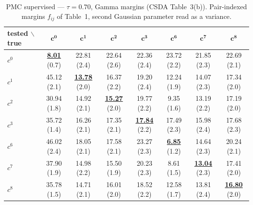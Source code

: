 \begin{table}[htbp]
  \centering
  \small
  \setlength{\tabcolsep}{4pt}
  \caption{PMC supervised — $\tau = 0.70$, Gamma margins (CSDA Table~3(b)). Pair-indexed margins $f_{ij}$ of Table~1, second Gaussian parameter read as a variance.}
  \label{tab:exp1-high_tau_gamma}
  \begin{tabular}{lccccccc}
    \toprule
    tested $\backslash$ true & $\mathbf{c^{0}}$ & $\mathbf{c^{1}}$ & $\mathbf{c^{2}}$ & $\mathbf{c^{3}}$ & $\mathbf{c^{6}}$ & $\mathbf{c^{7}}$ & $\mathbf{c^{8}}$ \\
    \midrule
    $c^{0}$ & \textbf{\underline{8.01}} (0.7) & 22.81 (2.4) & 22.64 (2.6) & 22.36 (2.4) & 23.72 (2.2) & 21.85 (2.3) & 22.69 (2.1) \\
    $c^{1}$ & 45.12 (2.1) & \textbf{\underline{13.78}} (2.0) & 16.37 (2.2) & 19.20 (2.4) & 12.24 (1.9) & 14.07 (2.3) & 17.34 (2.0) \\
    $c^{2}$ & 30.94 (1.8) & 14.92 (2.1) & \textbf{\underline{15.27}} (2.0) & 19.77 (2.2) & 9.35 (1.6) & 13.19 (2.2) & 17.19 (2.0) \\
    $c^{3}$ & 35.72 (1.4) & 16.26 (2.1) & 17.35 (2.1) & \textbf{\underline{17.84}} (2.2) & 17.49 (2.3) & 15.98 (2.4) & 17.68 (2.3) \\
    $c^{6}$ & 46.02 (2.4) & 18.05 (2.1) & 17.58 (2.1) & 23.27 (2.3) & \textbf{\underline{6.85}} (1.2) & 14.64 (2.3) & 20.24 (2.1) \\
    $c^{7}$ & 37.90 (1.9) & 14.98 (2.2) & 15.50 (1.9) & 20.23 (2.3) & 8.61 (1.5) & \textbf{\underline{13.04}} (2.3) & 17.41 (2.0) \\
    $c^{8}$ & 35.78 (1.5) & 14.71 (2.1) & 16.01 (2.0) & 18.52 (2.2) & 12.58 (1.7) & 13.81 (2.4) & \textbf{\underline{16.80}} (2.0) \\
    \bottomrule
  \end{tabular}
\end{table}
